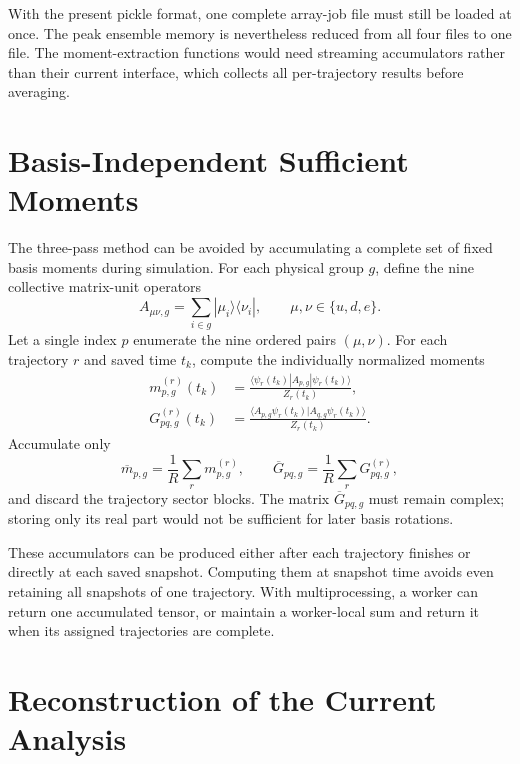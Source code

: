 \documentclass[11pt]{article}
\begin{document}
With the present pickle format, one complete array-job file must still be
loaded at once.  The peak ensemble memory is nevertheless reduced from all
four files to one file.  The moment-extraction functions would need streaming
accumulators rather than their current interface, which collects all
per-trajectory results before averaging.

\section{Basis-Independent Sufficient Moments}

The three-pass method can be avoided by accumulating a complete set of fixed
basis moments during simulation.  For each physical group $g$, define the nine
collective matrix-unit operators
\begin{equation}
  A_{\mu\nu,g}
  = \sum_{i\in g} |\mu_i\rangle\langle\nu_i|,
  \qquad
  \mu,\nu\in\{u,d,e\}.
\end{equation}
Let a single index $p$ enumerate the nine ordered pairs $(\mu,\nu)$.  For each
trajectory $r$ and saved time $t_k$, compute the individually normalized
moments
\begin{align}
  m_{p,g}^{(r)}(t_k)
  &=
  \frac{
    \langle\psi_r(t_k)|A_{p,g}|\psi_r(t_k)\rangle
  }{Z_r(t_k)},
  \\
  G_{pq,g}^{(r)}(t_k)
  &=
  \frac{
    \langle A_{p,g}\psi_r(t_k)
    |A_{q,g}\psi_r(t_k)\rangle
  }{Z_r(t_k)}.
\end{align}
Accumulate only
\begin{equation}
  \overline{m}_{p,g}
  = \frac{1}{R}\sum_r m_{p,g}^{(r)},
  \qquad
  \overline{G}_{pq,g}
  = \frac{1}{R}\sum_r G_{pq,g}^{(r)},
\end{equation}
and discard the trajectory sector blocks.  The matrix
$\overline{G}_{pq,g}$ must remain complex; storing only its real part would
not be sufficient for later basis rotations.

These accumulators can be produced either after each trajectory finishes or
directly at each saved snapshot.  Computing them at snapshot time avoids even
retaining all snapshots of one trajectory.  With multiprocessing, a worker
can return one accumulated tensor, or maintain a worker-local sum and return
it when its assigned trajectories are complete.

\section{Reconstruction of the Current Analysis}
\end{document}
